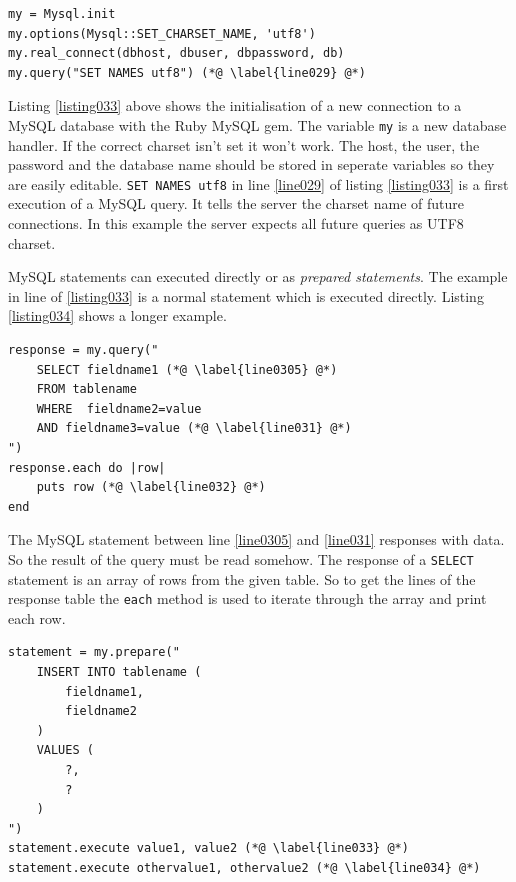 \begin{lstlisting}[aboveskip=1\baselineskip, caption=Initialising database connection., label=listing033]
my = Mysql.init
my.options(Mysql::SET_CHARSET_NAME, 'utf8')
my.real_connect(dbhost, dbuser, dbpassword, db)
my.query("SET NAMES utf8") (*@ \label{line029} @*)	
\end{lstlisting}

Listing \ref{listing033} above shows the initialisation of a new connection to a MySQL database with the Ruby MySQL gem. The variable \lstinline{my} is a new database handler. If the correct charset isn't set it won't work. The host, the user, the password and the database name should be stored in seperate variables so they are easily editable. \lstinline{SET NAMES utf8} in line \ref{line029} of listing \ref{listing033} is a first execution of a MySQL query. It tells the server the charset name of future connections. In this example the server expects all future queries as UTF8  charset.

MySQL statements can executed directly or as \emph{prepared statements}. The example in line \label{line029} of  \ref{listing033} is a normal statement which is executed directly. Listing \ref{listing034} shows a longer example. 

\begin{lstlisting}[aboveskip=1\baselineskip, caption=Example for a directly executed MySQL query., label=listing034]
response = my.query(" 
	SELECT fieldname1 (*@ \label{line0305} @*)
	FROM tablename 
	WHERE  fieldname2=value
	AND fieldname3=value (*@ \label{line031} @*)
")
response.each do |row|
	puts row (*@ \label{line032} @*)
end
\end{lstlisting}

The MySQL statement between line \ref{line0305} and \ref{line031} responses with data. So the result of the query must be read somehow. The response of a \lstinline{SELECT} statement is an array of rows from the given table. So to get the lines of the response table the \lstinline{each} method is used to iterate through the array and print each row.

\begin{lstlisting}[aboveskip=1\baselineskip, caption=\texttt{joomlaMultiple.rb} usage., label=listing029]
statement = my.prepare("
	INSERT INTO tablename (
		fieldname1,
		fieldname2
	) 
	VALUES (
		?,
		?
	)
")
statement.execute value1, value2 (*@ \label{line033} @*)
statement.execute othervalue1, othervalue2 (*@ \label{line034} @*)
\end{lstlisting}

